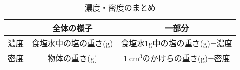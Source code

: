 \documentclass[dvipdfmx]{jsarticle}
\begin{document}
    \begin{table}[hbtp]\centering
        \caption{濃度・密度のまとめ}
        \label{tab_concentration_density}
        \begin{tabular}{|c|c|c|}\hline
            &全体の様子&一部分\\ \hline
            濃度&食塩水中の塩の重さ(g)&食塩水1g中の塩の重さ(g)=濃度\\ \hline
            密度&物体の重さ(g)&\(1\ \mathrm{cm}^3\)のかけらの重さ(g)=密度\\ \hline
        \end{tabular}
    \end{table}
\end{document}
